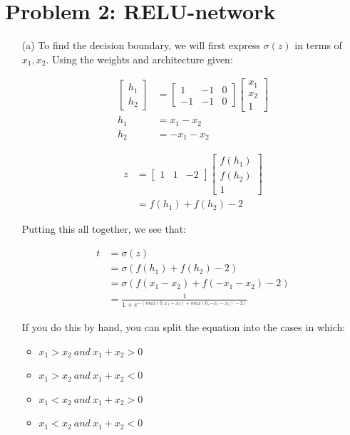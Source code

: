 \documentclass{article}
\begin{document}
\section*{Problem 2: RELU-network}
    \begin{enumerate}
        \item[(a)] To find the decision boundary, we will first express $\sigma(z)$ in terms of $x_1, x_2$. Using the weights and architecture given:

    \begin{align*}
        \begin{bmatrix} h_1 \\ h_2 \end{bmatrix} &= \begin{bmatrix} 1 & -1 & 0 \\ -1 & -1 & 0 \end{bmatrix} \begin{bmatrix} x_1 \\ x_2 \\ 1\end{bmatrix} \\
        h_1 &= x_1 - x_2 \\
        h_2 &= -x_1 - x_2
    \end{align*}

    \begin{align*}
        z &= \begin{bmatrix} 1 & 1 & -2 \end{bmatrix} \begin{bmatrix} f(h_1) \\ f(h_2) \\ 1 \end{bmatrix} \\
        &= f(h_1) +  f(h_2) - 2
    \end{align*}

    Putting this all together, we see that:

    \begin{align*}
        t &= \sigma(z) \\
        &= \sigma(f(h_1) + f(h_2) -2)\\
        &= \sigma(f(x_1 - x_2) + f(-x_1 - x_2) - 2) \\
        &= \frac{1}{1+e^{-(max(0, x_1 - x_2) + max(0, -x_1 - x_2) - 2)}}
    \end{align*}

    If you do this by hand, you can split the equation into the cases in which:
    \begin{itemize}
        \item $x_1 > x_2 ~ and ~ x_1 + x_2 > 0$
        \item $x_1 > x_2 ~ and ~ x_1 + x_2 < 0$
        \item $x_1 < x_2 ~ and ~ x_1 + x_2 > 0$
        \item $x_1 < x_2 ~ and ~ x_1 + x_2 < 0$
    \end{itemize}


\end{enumerate}
\end{document}
